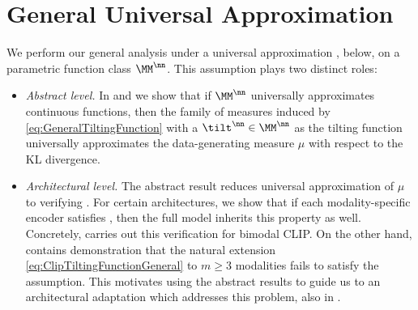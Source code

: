 \documentclass{article}
\begin{document}
\section{General Universal Approximation}
\label{sec:GeneralUA}
We perform our general analysis under a universal approximation
, below,
on a parametric function class $\MM^\nn$. This assumption plays
two distinct roles:
\begin{itemize}
 \item \emph{Abstract level.} In 
       and  we show that
       if $\MM^\nn$ universally approximates continuous functions,
       then the family of measures induced by \eqref{eq:GeneralTiltingFunction}
       with a $\tilt^\nn \in \MM^\nn$ as the tilting function
       universally approximates the data-generating measure $\mu$
       with respect to the KL divergence.
 \item \emph{Architectural level.}
       The abstract result reduces universal approximation of $\mu$ to
       verifying .
       For certain architectures, we show that
       if each modality-specific encoder satisfies
       ,
       then the full model inherits this property as well.
       Concretely,  carries out this
       verification for bimodal CLIP. On the other hand,
        contains
       demonstration that the natural
       extension \eqref{eq:ClipTiltingFunctionGeneral} to $m \geq 3$
       modalities fails to satisfy the assumption. 
       This motivates
       using the abstract results to guide us to an architectural
       adaptation which addresses this problem, also in
       .
\end{itemize}
\end{document}
